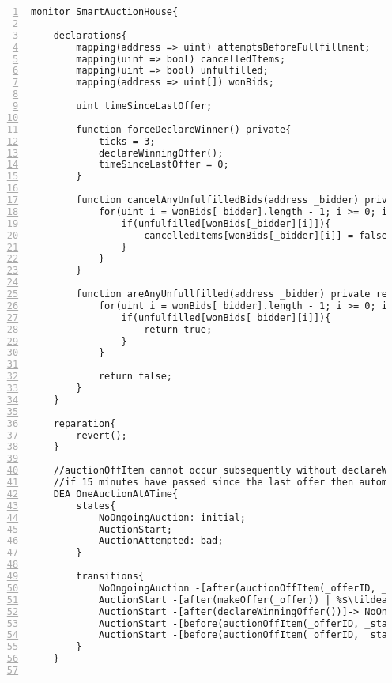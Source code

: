 \documentclass{article}
\newcommand{\tildearrow}{{\raise.37ex\hbox{$\scriptstyle\mathtt{\sim}$}}\hspace{-0.08cm}>\xspace}
\begin{document}
\small\begin{lstlisting}[language=DEA,basicstyle=\scriptsize,numbers=left,numbersep=2pt,xleftmargin=0.3cm,escapechar=\%,label={dea:auctionhouse}]
monitor SmartAuctionHouse{

    declarations{
        mapping(address => uint) attemptsBeforeFullfillment;
        mapping(uint => bool) cancelledItems; 
        mapping(uint => bool) unfulfilled; 
        mapping(address => uint[]) wonBids; 

        uint timeSinceLastOffer;

        function forceDeclareWinner() private{
            ticks = 3; 
            declareWinningOffer(); 
            timeSinceLastOffer = 0;
        }
        
        function cancelAnyUnfulfilledBids(address _bidder) private{
            for(uint i = wonBids[_bidder].length - 1; i >= 0; i--){
                if(unfulfilled[wonBids[_bidder][i]]){
                    cancelledItems[wonBids[_bidder][i]] = false;
                }
            }
        }

        function areAnyUnfullfilled(address _bidder) private returns(bool){
            for(uint i = wonBids[_bidder].length - 1; i >= 0; i--){
                if(unfulfilled[wonBids[_bidder][i]]){
                    return true;
                }
            }

            return false;
        }
    }

    reparation{
        revert();
    }

    //auctionOffItem cannot occur subsequently without declareWinningOffer in between
    //if 15 minutes have passed since the last offer then automatically declare the winner
    DEA OneAuctionAtATime{
        states{
            NoOngoingAuction: initial;
            AuctionStart;
            AuctionAttempted: bad;
        }

        transitions{
            NoOngoingAuction -[after(auctionOffItem(_offerID, _startingOffer))]-> AuctionStart;
            AuctionStart -[after(makeOffer(_offer)) | %$\tildearrow$% timeSinceLastOffer = now;]-> AuctionStart;
            AuctionStart -[after(declareWinningOffer())]-> NoOngoingAuction;
            AuctionStart -[before(auctionOffItem(_offerID, _startingOffer)) | now - timeSinceLastOffer < 15 minutes]-> AuctionAttempted;
            AuctionStart -[before(auctionOffItem(_offerID, _startingOffer)) | now - timeSinceLastOffer >= 15 minutes %$\tildearrow$% forceDeclareWinner();]-> AuctionStart;
        }
    }


\end{lstlisting}
\end{document}
